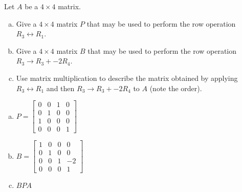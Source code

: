 
\begin{exerciseStatement}


Let \(A\) be a \(4 \times 4\) matrix.


\begin{enumerate}[(a)]
\item Give a \(4 \times 4\) matrix \(P\) that may be used to perform the row operation \( R_3 \leftrightarrow R_1 \).
\item Give a \(4 \times 4\) matrix \(B\) that may be used to perform the row operation \( R_3 \to R_3 + -2R_4 \).
\item Use matrix multiplication to describe the matrix obtained by applying \( R_3 \leftrightarrow R_1 \) and then \( R_3 \to R_3 + -2R_4 \) to \(A\) (note the order). 
\end{enumerate}
    
\end{exerciseStatement}
    
\begin{exerciseAnswer} 

\begin{enumerate}[(a)]
\item \(P= \left[\begin{array}{cccc}
0 & 0 & 1 & 0 \\
0 & 1 & 0 & 0 \\
1 & 0 & 0 & 0 \\
0 & 0 & 0 & 1
\end{array}\right] \)
\item \(B= \left[\begin{array}{cccc}
1 & 0 & 0 & 0 \\
0 & 1 & 0 & 0 \\
0 & 0 & 1 & -2 \\
0 & 0 & 0 & 1
\end{array}\right] \)
\item \(BPA\)
\end{enumerate}
    
\end{exerciseAnswer}
    

